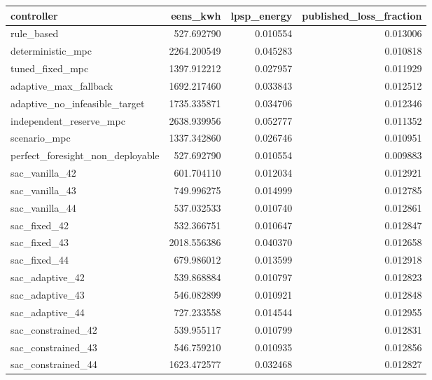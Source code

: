 \begin{tabular}{lrrr}
\toprule
controller & eens\_kwh & lpsp\_energy & published\_loss\_fraction \\
\midrule
rule\_based & 527.692790 & 0.010554 & 0.013006 \\
deterministic\_mpc & 2264.200549 & 0.045283 & 0.010818 \\
tuned\_fixed\_mpc & 1397.912212 & 0.027957 & 0.011929 \\
adaptive\_max\_fallback & 1692.217460 & 0.033843 & 0.012512 \\
adaptive\_no\_infeasible\_target & 1735.335871 & 0.034706 & 0.012346 \\
independent\_reserve\_mpc & 2638.939956 & 0.052777 & 0.011352 \\
scenario\_mpc & 1337.342860 & 0.026746 & 0.010951 \\
perfect\_foresight\_non\_deployable & 527.692790 & 0.010554 & 0.009883 \\
sac\_vanilla\_42 & 601.704110 & 0.012034 & 0.012921 \\
sac\_vanilla\_43 & 749.996275 & 0.014999 & 0.012785 \\
sac\_vanilla\_44 & 537.032533 & 0.010740 & 0.012861 \\
sac\_fixed\_42 & 532.366751 & 0.010647 & 0.012847 \\
sac\_fixed\_43 & 2018.556386 & 0.040370 & 0.012658 \\
sac\_fixed\_44 & 679.986012 & 0.013599 & 0.012918 \\
sac\_adaptive\_42 & 539.868884 & 0.010797 & 0.012823 \\
sac\_adaptive\_43 & 546.082899 & 0.010921 & 0.012848 \\
sac\_adaptive\_44 & 727.233558 & 0.014544 & 0.012955 \\
sac\_constrained\_42 & 539.955117 & 0.010799 & 0.012831 \\
sac\_constrained\_43 & 546.759210 & 0.010935 & 0.012856 \\
sac\_constrained\_44 & 1623.472577 & 0.032468 & 0.012827 \\
\bottomrule
\end{tabular}

